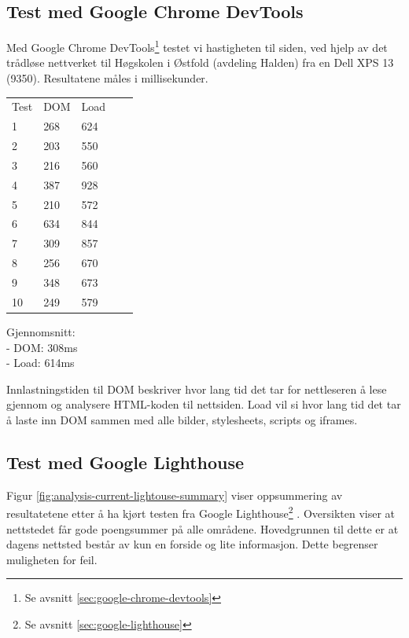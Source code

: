 \subsection{Test med Google Chrome DevTools}

Med Google Chrome DevTools\footnote{Se avsnitt \ref{sec:google-chrome-devtools}} testet vi hastigheten til siden, ved hjelp av det trådløse nettverket til Høgskolen i Østfold (avdeling Halden) fra en Dell XPS 13 (9350).
Resultatene måles i millisekunder.

\begin{table}[H]
\begin{tabular}{lllll}
Test & DOM & Load &  &  \\
1 & 268 & 624 &  &  \\
2 & 203 & 550 &  &  \\
3 & 216 & 560 &  &  \\
4 & 387 & 928 &  &  \\
5 & 210 & 572 &  &  \\
6 & 634 & 844 &  &  \\
7 & 309 & 857 &  &  \\
8 & 256 & 670 &  &  \\
9 & 348 & 673 &  &  \\
10 & 249 & 579 &  &  \\
\end{tabular}
\end{table}

Gjennomsnitt:\\
- DOM: 308ms\\
- Load: 614ms

Innlastningstiden til DOM beskriver hvor lang tid det tar for nettleseren å lese gjennom og analysere HTML-koden til nettsiden. Load vil si hvor lang tid det tar å laste inn DOM sammen med alle bilder, stylesheets, scripts og iframes.

\subsection{Test med Google Lighthouse}
\label{sec:analysis-current-lighthouse}

 Figur \ref{fig:analysis-current-lightouse-summary} viser oppsummering av resultatetene etter å ha kjørt testen fra Google Lighthouse\footnote{Se avsnitt \ref{sec:google-lighthouse}} . Oversikten viser at nettstedet får gode poengsummer på alle områdene. Hovedgrunnen til dette er at dagens nettsted består av kun en forside og lite informasjon. Dette begrenser muligheten for feil.

